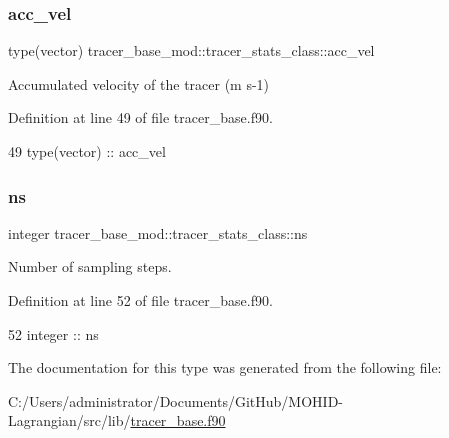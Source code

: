 \subsubsection{\texorpdfstring{acc\+\_\+vel}{acc\_vel}}
{\footnotesize\ttfamily type(vector) tracer\+\_\+base\+\_\+mod\+::tracer\+\_\+stats\+\_\+class\+::acc\+\_\+vel\hspace{0.3cm}{\ttfamily [private]}}



Accumulated velocity of the tracer (m s-\/1) 



Definition at line 49 of file tracer\+\_\+base.\+f90.


\begin{DoxyCode}
49         \textcolor{keywordtype}{type}(vector) :: acc\_vel
\end{DoxyCode}
\mbox{\label{structtracer__base__mod_1_1tracer__stats__class_a5e01cdc2592ecf31711151cf54e3b4d5}} 
\subsubsection{\texorpdfstring{ns}{ns}}
{\footnotesize\ttfamily integer tracer\+\_\+base\+\_\+mod\+::tracer\+\_\+stats\+\_\+class\+::ns\hspace{0.3cm}{\ttfamily [private]}}



Number of sampling steps. 



Definition at line 52 of file tracer\+\_\+base.\+f90.


\begin{DoxyCode}
52         \textcolor{keywordtype}{integer} :: ns
\end{DoxyCode}


The documentation for this type was generated from the following file\+:\begin{DoxyCompactItemize}
\item 
C\+:/\+Users/administrator/\+Documents/\+Git\+Hub/\+M\+O\+H\+I\+D-\/\+Lagrangian/src/lib/\mbox{\hyperlink{tracer__base_8f90}{tracer\+\_\+base.\+f90}}\end{DoxyCompactItemize}
